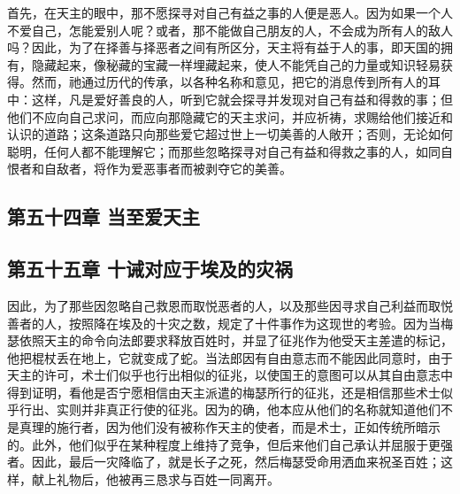 首先，在天主的眼中，那不愿探寻对自己有益之事的人便是恶人。因为如果一个人不爱自己，怎能爱别人呢？或者，那不能做自己朋友的人，不会成为所有人的敌人吗？因此，为了在择善与择恶者之间有所区分，天主将有益于人的事，即天国的拥有，隐藏起来，像秘藏的宝藏一样埋藏起来，使人不能凭自己的力量或知识轻易获得。然而，祂通过历代的传承，以各种名称和意见，把它的消息传到所有人的耳中：这样，凡是爱好善良的人，听到它就会探寻并发现对自己有益和得救的事；但他们不应向自己求问，而应向那隐藏它的天主求问，并应祈祷，求赐给他们接近和认识的道路；这条道路只向那些爱它超过世上一切美善的人敞开；否则，无论如何聪明，任何人都不能理解它；而那些忽略探寻对自己有益和得救之事的人，如同自恨者和自敌者，将作为爱恶事者而被剥夺它的美善。\par


\subsection{第五十四章  当至爱天主}

\par


\subsection{第五十五章  十诫对应于埃及的灾祸}

因此，为了那些因忽略自己救恩而取悦恶者的人，以及那些因寻求自己利益而取悦善者的人，按照降在埃及的十灾之数，规定了十件事作为这现世的考验。因为当梅瑟依照天主的命令向法郎要求释放百姓时，并显了征兆作为他受天主差遣的标记，他把棍杖丢在地上，它就变成了蛇。当法郎因有自由意志而不能因此同意时，由于天主的许可，术士们似乎也行出相似的征兆，以使国王的意图可以从其自由意志中得到证明，看他是否宁愿相信由天主派遣的梅瑟所行的征兆，还是相信那些术士似乎行出、实则并非真正行使的征兆。因为的确，他本应从他们的名称就知道他们不是真理的施行者，因为他们没有被称作天主的使者，而是术士，正如传统所暗示的。此外，他们似乎在某种程度上维持了竞争，但后来他们自己承认并屈服于更强者。因此，最后一灾降临了，就是长子之死，然后梅瑟受命用洒血来祝圣百姓；这样，献上礼物后，他被再三恳求与百姓一同离开。\par

